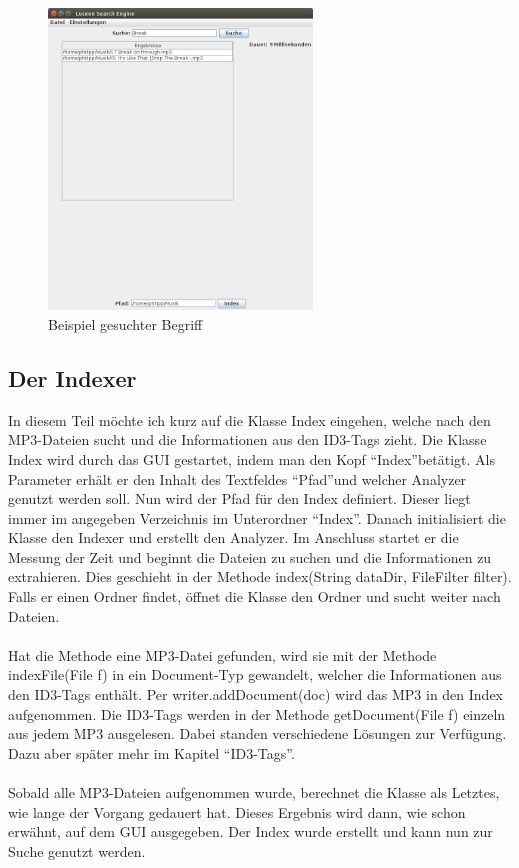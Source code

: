 \documentclass[12pt,a4paper,ngerman]{report}
\begin{document}
\begin{figure}[h!]
\centering
\includegraphics[width=7cm]{img/Lucene_Search_Engine_2.png}
\caption{Beispiel gesuchter Begriff\protect\footnotemark}
\end{figure}
\subsection{Der Indexer}
In diesem Teil möchte ich kurz auf die Klasse Index eingehen, welche nach den MP3-Dateien sucht und die Informationen aus den ID3-Tags zieht. Die Klasse Index wird durch das GUI gestartet, indem man den Kopf \textquotedblleft Index\textquotedblright betätigt. Als Parameter erhält er den Inhalt des Textfeldes \textquotedblleft Pfad\textquotedblright und welcher Analyzer genutzt werden soll. Nun wird der Pfad für den Index definiert. Dieser liegt immer im angegeben Verzeichnis im Unterordner \textquotedblleft Index\textquotedblright . Danach initialisiert die Klasse den Indexer und erstellt den Analyzer. Im Anschluss startet er die Messung der Zeit und beginnt die Dateien zu suchen und die Informationen zu extrahieren. Dies geschieht in der Methode index(String dataDir, FileFilter filter). Falls er einen Ordner findet, öffnet die Klasse den Ordner und sucht weiter nach Dateien.\\
\\
Hat die Methode eine MP3-Datei gefunden, wird sie mit der Methode indexFile(File f) in ein Document-Typ gewandelt, welcher die Informationen aus den ID3-Tags enthält. Per writer.addDocument(doc) wird das MP3 in den Index aufgenommen. Die ID3-Tags werden in der Methode getDocument(File f) einzeln aus jedem MP3 ausgelesen. Dabei standen verschiedene Lösungen zur Verfügung. Dazu aber später mehr im Kapitel \textquotedblleft ID3-Tags\textquotedblright .\\
\\
Sobald alle MP3-Dateien aufgenommen wurde, berechnet die Klasse als Letztes, wie lange der Vorgang gedauert hat. Dieses Ergebnis wird dann, wie schon erwähnt, auf dem GUI ausgegeben. Der Index wurde erstellt und kann nun zur Suche genutzt werden.
\end{document}
